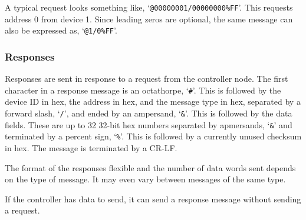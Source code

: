 \documentclass[10pt, openany, draft]{article}
\begin{document}
A typical request looks something like, `\texttt{@00000001/00000000\%FF}'.  This requests address 0 from device 1.  Since leading zeros are optional, the same message can also be expressed as, `\texttt{@1/0\%FF}'.

\subsubsection{Responses}
Responses are sent in response to a request from the controller node.  The first character in a response message is an octathorpe, `\texttt{\#}'.  This is followed by the device ID in hex, the address in hex, and the message type in hex, separated by a forward slash, `\texttt{/}', and ended by an ampersand, `\texttt{\&}'.  This is followed by the data fields.  These are up to 32 32-bit hex numbers separated by apmersands, `\texttt{\&}' and terminated by a percent sign, `\texttt{\%}'.  This is followed by a currently unused checksum in hex.  The message is terminated by a CR-LF.

The format of the responses flexible and the number of data words sent depends on the type of message.  It may even vary between messages of the same type.

If the controller has data to send, it can send a response message without sending a request.
\end{document}
